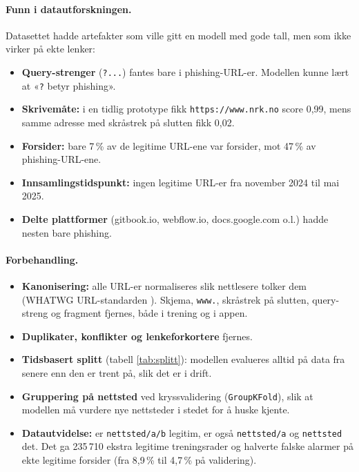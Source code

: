 \documentclass[11pt,a4paper]{article}
\newcommand{\code}[1]{\texttt{#1}}
\begin{document}
\paragraph{Funn i datautforskningen.} Datasettet hadde artefakter som ville gitt en modell med gode tall, men som ikke virker på ekte lenker:
\begin{itemize}
  \item \textbf{Query-strenger} (\code{?...}) fantes bare i phishing-URL-er. Modellen kunne lært at «\code{?} betyr phishing».
  \item \textbf{Skrivemåte:} i en tidlig prototype fikk \nolinkurl{https://www.nrk.no} score 0,99, mens samme adresse med skråstrek på slutten fikk 0,02.
  \item \textbf{Forsider:} bare 7\,\% av de legitime URL-ene var forsider, mot 47\,\% av phishing-URL-ene.
  \item \textbf{Innsamlingstidspunkt:} ingen legitime URL-er fra november 2024 til mai 2025.
  \item \textbf{Delte plattformer} (gitbook.io, webflow.io, docs.google.com o.l.) hadde nesten bare phishing.
\end{itemize}

\paragraph{Forbehandling.}
\begin{itemize}
  \item \textbf{Kanonisering:} alle URL-er normaliseres slik nettlesere tolker dem (WHATWG URL-standarden \cite{whatwg}). Skjema, \code{www.}, skråstrek på slutten, query-streng og fragment fjernes, både i trening og i appen.
  \item \textbf{Duplikater, konflikter og lenkeforkortere} fjernes.
  \item \textbf{Tidsbasert splitt} (tabell \ref{tab:splitt}): modellen evalueres alltid på data fra senere enn den er trent på, slik det er i drift.
  \item \textbf{Gruppering på nettsted} ved kryssvalidering (\code{GroupKFold}), slik at modellen må vurdere nye nettsteder i stedet for å huske kjente.
  \item \textbf{Datautvidelse:} er \code{nettsted/a/b} legitim, er også \code{nettsted/a} og \code{nettsted} det. Det ga 235\,710 ekstra legitime treningsrader og halverte falske alarmer på ekte legitime forsider (fra 8,9\,\% til 4,7\,\% på validering).
\end{itemize}
\end{document}
